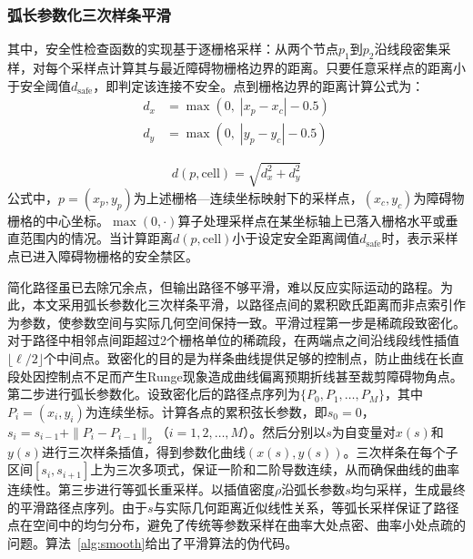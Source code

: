 \documentclass[lettersize,journal]{IEEEtran}
\begin{document}
\subsubsection{弧长参数化三次样条平滑}

其中，安全性检查函数的实现基于逐栅格采样：从两个节点$p_1$到$p_2$沿线段密集采样，对每个采样点计算其与最近障碍物栅格边界的距离。只要任意采样点的距离小于安全阈值$d_{\mathrm{safe}}$，即判定该连接不安全。点到栅格边界的距离计算公式为：
\begin{equation}
\begin{split}
d_x &= \max\left(0,\; |x_p - x_c| - 0.5\right)\\
d_y &= \max\left(0,\; |y_p - y_c| - 0.5\right)
\end{split}
\label{eq:dxymax}
\end{equation}

\begin{equation}
d(p, \mathrm{cell}) = \sqrt{d_x^2 + d_y^2}
\label{eq:dist}
\end{equation}
公式中，$p = (x_p, y_p)$为上述栅格—连续坐标映射下的采样点，$(x_c, y_c)$为障碍物栅格的中心坐标。$\max(0, \cdot)$算子处理采样点在某坐标轴上已落入栅格水平或垂直范围内的情况。当计算距离$d(p, \mathrm{cell})$小于设定安全距离阈值$d_{\mathrm{safe}}$时，表示采样点已进入障碍物栅格的安全禁区。

简化路径虽已去除冗余点，但输出路径不够平滑，难以反应实际运动的路程。为此，本文采用弧长参数化三次样条平滑，以路径点间的累积欧氏距离而非点索引作为参数，使参数空间与实际几何空间保持一致。平滑过程第一步是稀疏段致密化。对于路径中相邻点间距超过2个栅格单位的稀疏段，在两端点之间沿线段线性插值$\lfloor \ell / 2 \rfloor$个中间点。致密化的目的是为样条曲线提供足够的控制点，防止曲线在长直段处因控制点不足而产生Runge现象造成曲线偏离预期折线甚至裁剪障碍物角点。第二步进行弧长参数化。设致密化后的路径点序列为$\{P_0, P_1, \ldots, P_M\}$，其中$P_i = (x_i, y_i)$为连续坐标。计算各点的累积弦长参数，即$s_0 = 0$，$s_i = s_{i-1} + \|P_i - P_{i-1}\|_2$（$i = 1, 2, \ldots, M$）。然后分别以$s$为自变量对$x(s)$和$y(s)$进行三次样条插值，得到参数化曲线$(x(s), y(s))$。三次样条在每个子区间$[s_i, s_{i+1}]$上为三次多项式，保证一阶和二阶导数连续，从而确保曲线的曲率连续性。第三步进行等弧长重采样。以插值密度$\rho$沿弧长参数$s$均匀采样，生成最终的平滑路径点序列。由于$s$与实际几何距离近似线性关系，等弧长采样保证了路径点在空间中的均匀分布，避免了传统等参数采样在曲率大处点密、曲率小处点疏的问题。算法~\textcolor{blue}{\ref{alg:smooth}}给出了平滑算法的伪代码。
\end{document}
